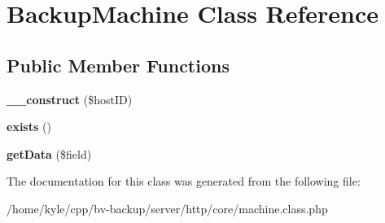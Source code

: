 \hypertarget{class_backup_machine}{}\section{Backup\+Machine Class Reference}
\label{class_backup_machine}
\subsection*{Public Member Functions}
\begin{DoxyCompactItemize}
\item 
\mbox{\label{class_backup_machine_a8b0fa3d937601284fc8546dabc0f653e}} 
{\bfseries \+\_\+\+\_\+construct} (\$host\+ID)
\item 
\mbox{\label{class_backup_machine_a08f03ec33aaaeb9acfeb06eff67180fe}} 
{\bfseries exists} ()
\item 
\mbox{\label{class_backup_machine_a795a38b44aed0468c8a3e13da854e084}} 
{\bfseries get\+Data} (\$field)
\end{DoxyCompactItemize}


The documentation for this class was generated from the following file\+:\begin{DoxyCompactItemize}
\item 
/home/kyle/cpp/bv-\/backup/server/http/core/machine.\+class.\+php\end{DoxyCompactItemize}
